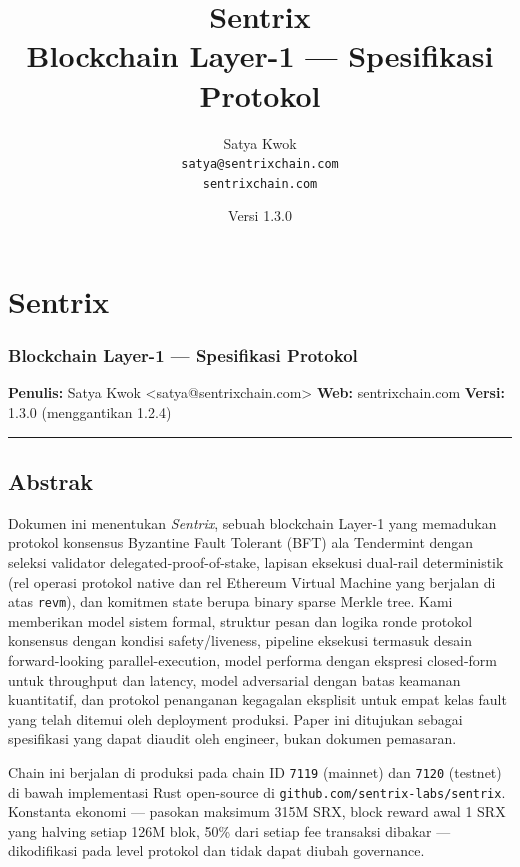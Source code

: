 \documentclass[11pt,a4paper]{article}
\title{\textbf{Sentrix}\\[2pt]\large Blockchain Layer-1 --- Spesifikasi Protokol}
\author{Satya Kwok \\ \texttt{satya@sentrixchain.com} \\ \texttt{sentrixchain.com}}
\date{Versi 1.3.0}
\begin{document}
\maketitle
\tableofcontents
\newpage

\hypertarget{sentrix}{%
\section{Sentrix}\label{sentrix}}

\hypertarget{blockchain-layer-1-spesifikasi-protokol}{%
\subsubsection{Blockchain Layer-1 --- Spesifikasi Protokol}\label{blockchain-layer-1-spesifikasi-protokol}}

\textbf{Penulis:} Satya Kwok \textless satya@sentrixchain.com\textgreater{}
\textbf{Web:} sentrixchain.com
\textbf{Versi:} 1.3.0 (menggantikan 1.2.4)

\begin{center}\rule{0.5\linewidth}{0.5pt}\end{center}

\hypertarget{abstrak}{%
\subsection{Abstrak}\label{abstrak}}

Dokumen ini menentukan \emph{Sentrix}, sebuah blockchain Layer-1 yang memadukan protokol konsensus Byzantine Fault Tolerant (BFT) ala Tendermint dengan seleksi validator delegated-proof-of-stake, lapisan eksekusi dual-rail deterministik (rel operasi protokol native dan rel Ethereum Virtual Machine yang berjalan di atas \texttt{revm}), dan komitmen state berupa binary sparse Merkle tree. Kami memberikan model sistem formal, struktur pesan dan logika ronde protokol konsensus dengan kondisi safety/liveness, pipeline eksekusi termasuk desain forward-looking parallel-execution, model performa dengan ekspresi closed-form untuk throughput dan latency, model adversarial dengan batas keamanan kuantitatif, dan protokol penanganan kegagalan eksplisit untuk empat kelas fault yang telah ditemui oleh deployment produksi. Paper ini ditujukan sebagai spesifikasi yang dapat diaudit oleh engineer, bukan dokumen pemasaran.

Chain ini berjalan di produksi pada chain ID \texttt{7119} (mainnet) dan \texttt{7120} (testnet) di bawah implementasi Rust open-source di \texttt{github.com/sentrix-labs/sentrix}. Konstanta ekonomi --- pasokan maksimum 315M SRX, block reward awal 1 SRX yang halving setiap 126M blok, 50\% dari setiap fee transaksi dibakar --- dikodifikasi pada level protokol dan tidak dapat diubah governance.
\end{document}
